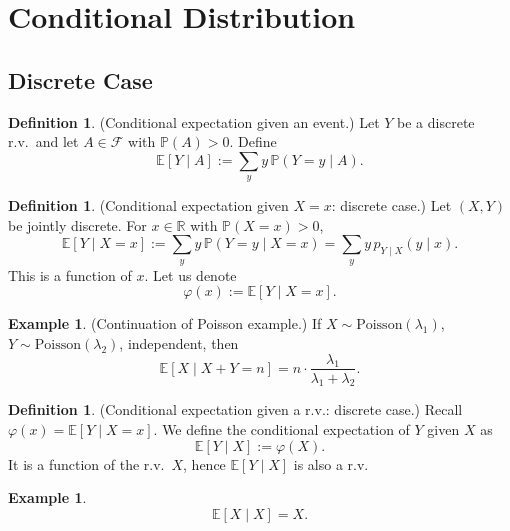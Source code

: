 \documentclass[11pt]{article}
\theoremstyle{plain}
\theoremstyle{definition}
\newtheorem{definition}[theorem]{Definition}
\newtheorem{example}[theorem]{Example}
\theoremstyle{remark}
\newcommand{\R}{\mathbb{R}}
\begin{document}
	
	
	
	\section{Conditional Distribution}
	
	\subsection{Discrete Case}
	
	\begin{definition}
		(Conditional expectation given an event.)
		Let \(Y\) be a discrete r.v.\ and let \(A\in\mathcal{F}\) with \(\mathbb{P}(A)>0\).
		Define
		\[
		\mathbb{E}[Y\mid A]:=\sum_{y} y\,\mathbb{P}(Y=y\mid A).
		\]
	\end{definition}
	
	\begin{definition}
		(Conditional expectation given \(X=x\): discrete case.)
		Let \((X,Y)\) be jointly discrete.
		For \(x\in\R\) with \(\mathbb{P}(X=x)>0\),
		\[
		\mathbb{E}[Y\mid X=x]
		:=\sum_{y} y\,\mathbb{P}(Y=y\mid X=x)
		=\sum_{y} y\,p_{Y\mid X}(y\mid x).
		\]
		This is a function of \(x\). Let us denote
		\[
		\varphi(x):=\mathbb{E}[Y\mid X=x].
		\]
	\end{definition}
	
	\begin{example}
		(Continuation of Poisson example.)
		If \(X\sim \mathrm{Poisson}(\lambda_1)\), \(Y\sim \mathrm{Poisson}(\lambda_2)\), independent, then
		\[
		\mathbb{E}[X\mid X+Y=n]
		=n\cdot \frac{\lambda_1}{\lambda_1+\lambda_2}.
		\]
	\end{example}
	
	
	
	\begin{definition}
		(Conditional expectation given a r.v.: discrete case.)
		Recall \(\varphi(x)=\mathbb{E}[Y\mid X=x]\).
		We define the conditional expectation of \(Y\) given \(X\) as
		\[
		\mathbb{E}[Y\mid X]:=\varphi(X).
		\]
		It is a function of the r.v.\ \(X\), hence \(\mathbb{E}[Y\mid X]\) is also a r.v.
	\end{definition}
	
	\begin{example}
		\[
		\mathbb{E}[X\mid X]=X.
		\]
	\end{example}
	
\end{document}

